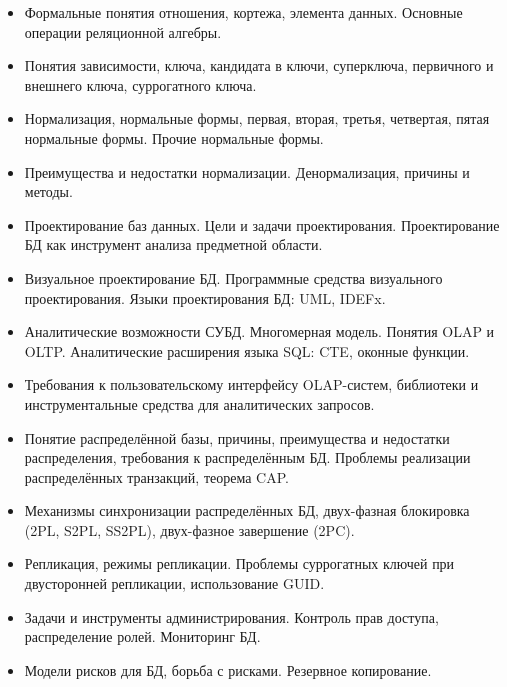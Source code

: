 \documentclass[a4paper]{article}
\begin{document}
\begin{itemize}
  \item Формальные понятия отношения, кортежа, элемента данных. Основные операции реляционной алгебры.
  \item Понятия зависимости, ключа, кандидата в ключи, суперключа, первичного и внешнего ключа, суррогатного ключа.
  \item Нормализация, нормальные формы, первая, вторая, третья, четвертая, пятая нормальные формы. Прочие нормальные формы.
  \item Преимущества и недостатки нормализации. Денормализация, причины и методы.
  \item Проектирование баз данных. Цели и задачи проектирования. Проектирование БД как инструмент анализа предметной области.
  \item Визуальное проектирование БД. Программные средства визуального проектирования. Языки проектирования БД: UML, IDEFx.
\end{itemize}

\begin{itemize}
  \item Аналитические возможности СУБД. Многомерная модель. Понятия OLAP и OLTP. Аналитические расширения языка SQL: CTE, оконные функции.
  \item Требования к пользовательскому интерфейсу OLAP-систем, библиотеки и инструментальные средства для аналитических запросов.
\end{itemize}


\begin{itemize}
  \item Понятие распределённой базы, причины, преимущества и недостатки распределения, требования к распределённым БД.
    Проблемы реализации распределённых транзакций, теорема CAP.
  \item Механизмы синхронизации распределённых БД, двух-фазная блокировка (2PL, S2PL, SS2PL), двух-фазное завершение (2PC).
  \item Репликация, режимы репликации. Проблемы суррогатных ключей при двусторонней репликации, использование GUID.
\end{itemize}

\begin{itemize}
  \item Задачи и инструменты администрирования. Контроль прав доступа, распределение ролей. Мониторинг БД.
  \item Модели рисков для БД, борьба с рисками. Резервное копирование.
\end{itemize}
\end{document}
